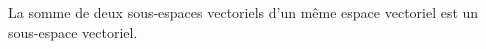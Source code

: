 La somme de deux sous-espaces vectoriels d'un même espace vectoriel est un sous-espace vectoriel.

\begin{reponses}
\end{reponses}

